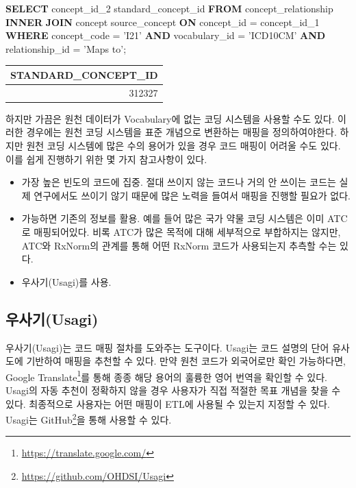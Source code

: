 \documentclass[11pt]{book}
\newenvironment{Shaded}{\begin{snugshade}}{\end{snugshade}}
\newcommand{\KeywordTok}[1]{\textcolor[rgb]{0.13,0.29,0.53}{\textbf{#1}}}
\newcommand{\DecValTok}[1]{\textcolor[rgb]{0.00,0.00,0.81}{#1}}
\newcommand{\StringTok}[1]{\textcolor[rgb]{0.31,0.60,0.02}{#1}}
\newcommand{\NormalTok}[1]{#1}
\providecommand{\tightlist}{%
  \setlength{\itemsep}{0pt}\setlength{\parskip}{0pt}}
\let\rmarkdownfootnote\footnote%
\def\footnote{\protect\rmarkdownfootnote}
\theoremstyle{definition}
\theoremstyle{definition}
\theoremstyle{definition}
\theoremstyle{remark}
\begin{document}
\begin{Shaded}
\begin{Highlighting}[]
\KeywordTok{SELECT}\NormalTok{ concept_id_2 standard_concept_id}
\KeywordTok{FROM}\NormalTok{ concept_relationship}
\KeywordTok{INNER} \KeywordTok{JOIN}\NormalTok{ concept source_concept}
  \KeywordTok{ON}\NormalTok{ concept_id = concept_id_}\DecValTok{1}
\KeywordTok{WHERE}\NormalTok{ concept_code = }\StringTok{'I21'}
  \KeywordTok{AND}\NormalTok{ vocabulary_id = }\StringTok{'ICD10CM'}
  \KeywordTok{AND}\NormalTok{ relationship_id = }\StringTok{'Maps to'}\NormalTok{; }
\end{Highlighting}
\end{Shaded}

\begin{longtable}[]{@{}r@{}}
\toprule
STANDARD\_CONCEPT\_ID\tabularnewline
\midrule
\endhead
312327\tabularnewline
\bottomrule
\end{longtable}

하지만 가끔은 원천 데이터가 Vocabulary에 없는 코딩 시스템을 사용할 수도
있다. 이러한 경우에는 원천 코딩 시스템을 표준 개념으로 변환하는 매핑을
정의하여야한다. 하지만 원천 코딩 시스템에 많은 수의 용어가 있을 경우
코드 매핑이 어려울 수도 있다. 이를 쉽게 진행하기 위한 몇 가지 참고사항이
있다.

\begin{itemize}
\tightlist
\item
  가장 높은 빈도의 코드에 집중. 절대 쓰이지 않는 코드나 거의 안 쓰이는
  코드는 실제 연구에서도 쓰이기 않기 때문에 많은 노력을 들여서 매핑을
  진행할 필요가 없다.
\item
  가능하면 기존의 정보를 활용. 예를 들어 많은 국가 약물 코딩 시스템은
  이미 ATC로 매핑되어있다. 비록 ATC가 많은 목적에 대해 세부적으로
  부합하지는 않지만, ATC와 RxNorm의 관계를 통해 어떤 RxNorm 코드가
  사용되는지 추측할 수는 있다.
\item
  우사기(Usagi)를 사용.
\end{itemize}

\subsection{우사기(Usagi)}\label{usagi}

우사기(Usagi)는 코드 매핑 절차를 도와주는 도구이다. Usagi는 코드 설명의
단어 유사도에 기반하여 매핑을 추천할 수 있다. 만약 원천 코드가
외국어로만 확인 가능하다면, Google Translate\footnote{\url{https://translate.google.com/}}를
통해 종종 해당 용어의 훌륭한 영어 번역을 확인할 수 있다. Usagi의 자동
추천이 정확하지 않을 경우 사용자가 직접 적절한 목표 개념을 찾을 수 있다.
최종적으로 사용자는 어떤 매핑이 ETL에 사용될 수 있는지 지정할 수 있다.
Usagi는 GitHub\footnote{\url{https://github.com/OHDSI/Usagi}}을 통해
사용할 수 있다.  
\end{document}
